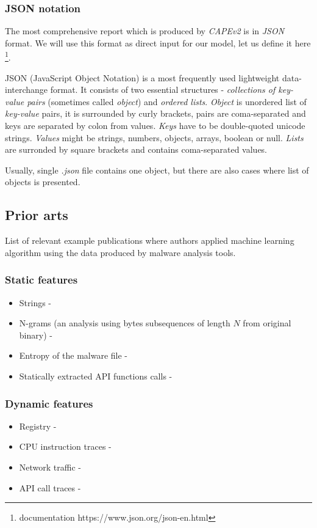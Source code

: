 \subsubsection{JSON notation} \label{sec:json_notation}
The most comprehensive report which is produced by \emph{CAPEv2} is in \emph{JSON} format. We will use this format as direct input for our model, let us define it here \footnote{documentation https://www.json.org/json-en.html}.

JSON (JavaScript Object Notation) is a most frequently used lightweight data-interchange format. It consists of two essential structures - \emph{collections of key-value pairs} (sometimes called \emph{object}) and \emph{ordered lists}. 
\emph{Object} is unordered list of \emph{key-value} pairs, it is surrounded by curly brackets, pairs are coma-separated and keys are separated by colon from values. \emph{Keys} have to be double-quoted unicode strings. \emph{Values} might be strings, numbers, objects, arrays, boolean or null. \emph{Lists} are surronded by square brackets and contains coma-separated values.

Usually, single \emph{.json} file contains one object, but there are also cases where list of objects is presented.

\subsection{Prior arts}
List of relevant example publications where authors applied machine learning algorithm using the data produced by malware analysis tools.
\subsubsection{Static features}
\begin{itemize}
  \item Strings - \cite{Lee2011}
  \item N-grams (an analysis using bytes subsequences of length $N$ from original binary) - \cite{Fuyong2017}
  \item Entropy of the malware file - \cite{Wojnowicz2018}
  \item Statically extracted API functions calls - \cite{Ahmadi2016}
\end{itemize}

\subsubsection{Dynamic features}
\begin{itemize}
  \item Registry - \cite{Ghiasi2015}
  \item CPU instruction traces - \cite{Carlin2017}
  \item Network traffic - \cite{Boukhtouta2015}
  \item API call traces -  \cite{Galal2015}
\end{itemize}

